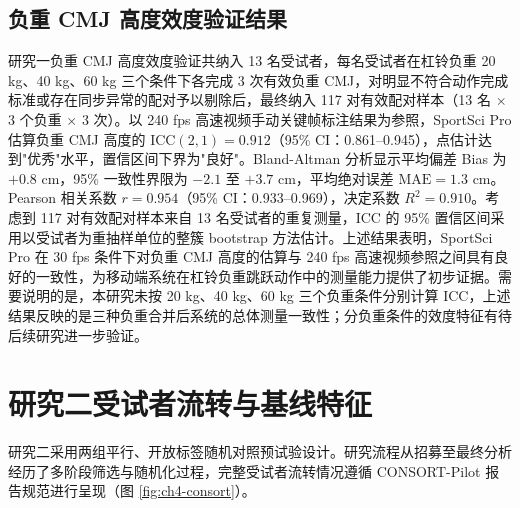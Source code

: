 \documentclass[UTF8,zihao=-4,twoside,openany]{ctexbook}
\begin{document}
\subsection{负重 CMJ 高度效度验证结果}
研究一负重 CMJ 高度效度验证共纳入 13 名受试者，每名受试者在杠铃负重 20 kg、40 kg、60 kg 三个条件下各完成 3 次有效负重 CMJ，对明显不符合动作完成标准或存在同步异常的配对予以剔除后，最终纳入 117 对有效配对样本（13 名 $\times$ 3 个负重 $\times$ 3 次）。以 240 fps 高速视频手动关键帧标注结果为参照，SportSci Pro 估算负重 CMJ 高度的 $\text{ICC}(2,1) = 0.912$（95\% CI：0.861--0.945），点估计达到"优秀"水平，置信区间下界为"良好"。Bland-Altman 分析显示平均偏差 Bias 为 $+0.8\text{ cm}$，95\% 一致性界限为 $-2.1$ 至 $+3.7\text{ cm}$，平均绝对误差 $\text{MAE} = 1.3\text{ cm}$。Pearson 相关系数 $r = 0.954$（95\% CI：0.933--0.969），决定系数 $R^2 = 0.910$。考虑到 117 对有效配对样本来自 13 名受试者的重复测量，ICC 的 95\% 置信区间采用以受试者为重抽样单位的整簇 bootstrap 方法估计。上述结果表明，SportSci Pro 在 30 fps 条件下对负重 CMJ 高度的估算与 240 fps 高速视频参照之间具有良好的一致性，为移动端系统在杠铃负重跳跃动作中的测量能力提供了初步证据。需要说明的是，本研究未按 20 kg、40 kg、60 kg 三个负重条件分别计算 ICC，上述结果反映的是三种负重合并后系统的总体测量一致性；分负重条件的效度特征有待后续研究进一步验证。

\section{研究二受试者流转与基线特征}
研究二采用两组平行、开放标签随机对照预试验设计。研究流程从招募至最终分析经历了多阶段筛选与随机化过程，完整受试者流转情况遵循 CONSORT-Pilot 报告规范进行呈现（图 \ref{fig:ch4-consort}）。
\end{document}
